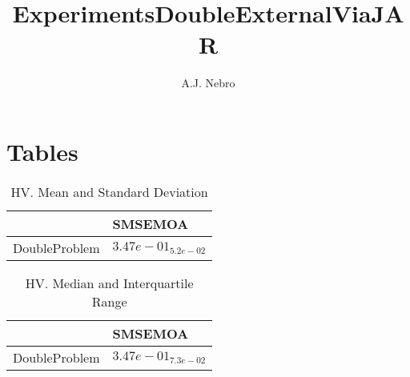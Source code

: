 \documentclass{article}
\title{ExperimentsDoubleExternalViaJAR}
\author{A.J. Nebro}
\begin{document}
\maketitle
\section{Tables}

\begin{table}
\caption{HV. Mean and Standard Deviation}
\label{table: HV}
\centering
\begin{scriptsize}
\begin{tabular}{ll}
\hline &  SMSEMOA\\
\hline 
DoubleProblem & \cellcolor{gray95}$  3.47e-01_{ 5.2e-02}$ \\
\hline
\end{tabular}
\end{scriptsize}
\end{table}

\begin{table}
\caption{HV. Median and Interquartile Range}
\label{table: HV}
\centering
\begin{scriptsize}
\begin{tabular}{ll}
\hline &  SMSEMOA\\
\hline 
DoubleProblem & \cellcolor{gray95}$  3.47e-01_{ 7.3e-02}$ \\
\hline
\end{tabular}
\end{scriptsize}
\end{table}
\end{document}
